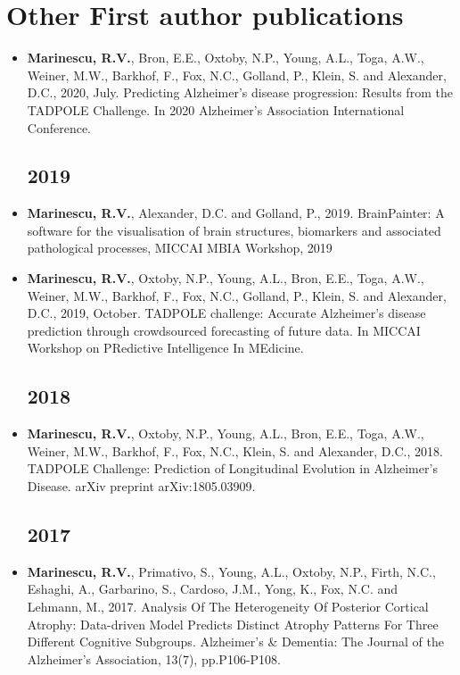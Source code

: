 \documentclass[a4paper,10pt]{article} %
\begin{document}
\section*{Other First author publications}

\begin{itemize}

\subsection*{2020}
\item[\talk] \textbf{Marinescu, R.V.}, Bron, E.E., Oxtoby, N.P., Young, A.L., Toga, A.W., Weiner, M.W., Barkhof, F., Fox, N.C., Golland, P., Klein, S. and Alexander, D.C., 2020, July. Predicting Alzheimer's disease progression: Results from the TADPOLE Challenge. In 2020 Alzheimer's Association International Conference.

\subsection*{2019}
\item[\talk] \textbf{Marinescu, R.V.}, Alexander, D.C. and Golland, P., 2019. BrainPainter: A software for the visualisation of brain structures, biomarkers and associated pathological processes, MICCAI MBIA Workshop, 2019
\item[\talk] \textbf{Marinescu, R.V.}, Oxtoby, N.P., Young, A.L., Bron, E.E., Toga, A.W., Weiner, M.W., Barkhof, F., Fox, N.C., Golland, P., Klein, S. and Alexander, D.C., 2019, October. TADPOLE challenge: Accurate Alzheimer's disease prediction through crowdsourced forecasting of future data. In MICCAI Workshop on PRedictive Intelligence In MEdicine.
\subsection*{2018}
\item[\journal] \textbf{Marinescu, R.V.}, Oxtoby, N.P., Young, A.L., Bron, E.E., Toga, A.W., Weiner, M.W., Barkhof, F., Fox, N.C., Klein, S. and Alexander, D.C., 2018. TADPOLE Challenge: Prediction of Longitudinal Evolution in Alzheimer's Disease. arXiv preprint arXiv:1805.03909.
\subsection*{2017}
\item[\poster] \textbf{Marinescu, R.V.}, Primativo, S., Young, A.L., Oxtoby, N.P., Firth, N.C., Eshaghi, A., Garbarino, S., Cardoso, J.M., Yong, K., Fox, N.C. and Lehmann, M., 2017. Analysis Of The Heterogeneity Of Posterior Cortical Atrophy: Data-driven Model Predicts Distinct Atrophy Patterns For Three Different Cognitive Subgroups. Alzheimer's \& Dementia: The Journal of the Alzheimer's Association, 13(7), pp.P106-P108.

\end{itemize}
\end{document}
